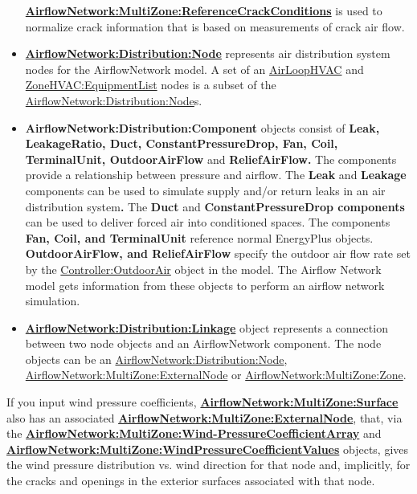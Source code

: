 \begin{itemize}
  \textbf{\hyperref[airflownetworkmultizonereferencecrackconditions]{AirflowNetwork:MultiZone:ReferenceCrackConditions}} is used to normalize crack information that is based on measurements of crack air flow.
\item
  \textbf{\hyperref[airflownetworkdistributionnode]{AirflowNetwork:Distribution:Node}} represents air distribution system nodes for the AirflowNetwork model. A set of an \hyperref[airloophvac]{AirLoopHVAC} and \hyperref[zonehvacequipmentlist]{ZoneHVAC:EquipmentList} nodes is a subset of the \hyperref[airflownetworkdistributionnode]{AirflowNetwork:Distribution:Node}s.
\item
  \textbf{AirflowNetwork:Distribution:Component} objects consist of \textbf{Leak, LeakageRatio, Duct, ConstantPressureDrop, Fan, Coil, TerminalUnit, OutdoorAirFlow} and \textbf{ReliefAirFlow.} The components provide a relationship between pressure and airflow. The \textbf{Leak} and \textbf{Leakage} components can be used to simulate supply and/or return leaks in an air distribution system\textbf{.} The \textbf{Duct} and \textbf{ConstantPressureDrop components} can be used to deliver forced air into conditioned spaces. The components \textbf{Fan, Coil, and TerminalUnit} reference normal EnergyPlus objects. \textbf{OutdoorAirFlow, and ReliefAirFlow} specify the outdoor air flow rate set by the \hyperref[controlleroutdoorair]{Controller:OutdoorAir} object in the model. The Airflow Network model gets information from these objects to perform an airflow network simulation.
\item
  \textbf{\hyperref[airflownetworkdistributionlinkage]{AirflowNetwork:Distribution:Linkage}} object represents a connection between two node objects and an AirflowNetwork component. The node objects can be an \hyperref[airflownetworkdistributionnode]{AirflowNetwork:Distribution:Node}, \hyperref[airflownetworkmultizoneexternalnode]{AirflowNetwork:MultiZone:ExternalNode} or \hyperref[airflownetworkmultizonezone]{AirflowNetwork:MultiZone:Zone}.
\end{itemize}

If you input wind pressure coefficients, \textbf{\hyperref[airflownetworkmultizonesurface]{AirflowNetwork:MultiZone:Surface}} also has an associated \textbf{\hyperref[airflownetworkmultizoneexternalnode]{AirflowNetwork:MultiZone:ExternalNode}}, that, via the \textbf{\hyperref[airflownetworkmultizonewindpressurecoefficientarray]{AirflowNetwork:MultiZone:Wind-PressureCoefficientArray}} and \textbf{\hyperref[airflownetworkmultizonewindpressurecoefficientvalues]{AirflowNetwork:MultiZone:WindPressureCoefficientValues}} objects, gives the wind pressure distribution vs. wind direction for that node and, implicitly, for the cracks and openings in the exterior surfaces associated with that node.

